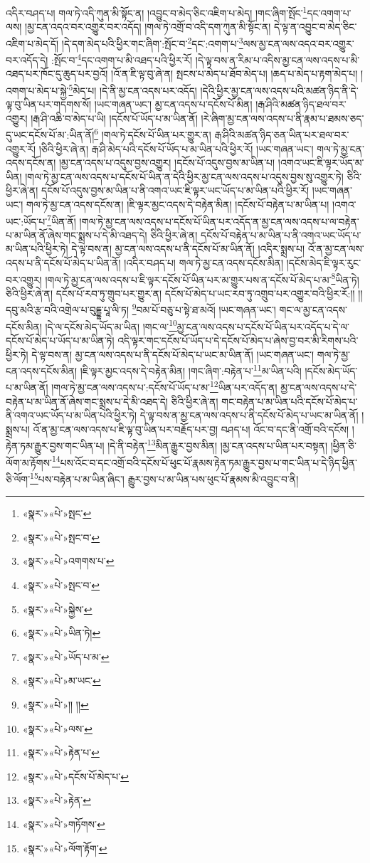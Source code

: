 འདིར་བཤད་པ། གལ་ཏེ་འདི་ཀུན་མི་སྟོང་ན། །འབྱུང་བ་མེད་ཅིང་འཇིག་པ་མེད། །གང་ཞིག་སྤོང་\footnote{«སྣར་»«པེ་»སྤང་}དང་འགག་པ་ལས། །མྱ་ངན་འདའ་བར་འགྱུར་བར་འདོད། །གལ་ཏེ་འགྲོ་བ་འདི་དག་ཀུན་མི་སྟོང་ན། དེ་ལྟ་ན་འབྱུང་བ་མེད་ཅིང་འཇིག་པ་མེད་དོ། །དེ་དག་མེད་པའི་ཕྱིར་གང་ཞིག་:སྤོང་བ་\footnote{«སྣར་»«པེ་»སྤང་བ་}དང་:འགག་པ་\footnote{«སྣར་»«པེ་»འགགས་པ་}ལས་མྱ་ངན་ལས་འདའ་བར་འགྱུར་བར་འདོད་དེ། :སྤོང་བ་\footnote{«སྣར་»«པེ་»སྤང་བ་}དང་འགག་པ་མི་འཐད་པའི་ཕྱིར་རོ། །དེ་ལྟ་བས་ན་རིམ་པ་འདིས་མྱ་ངན་ལས་འདས་པ་མི་འཐད་པར་ཁོང་དུ་ཆུད་པར་བྱའོ། །འོ་ན་ཇི་ལྟ་བུ་ཞེ་ན། སྤངས་པ་མེད་པ་ཐོབ་མེད་པ། །ཆད་པ་མེད་པ་རྟག་མེད་པ། །འགག་པ་མེད་པ་སྐྱེ་\footnote{«སྣར་»«པེ་»སྐྱེས་}མེད་པ། །དེ་ནི་མྱ་ངན་འདས་པར་འདོད། །དེའི་ཕྱིར་མྱ་ངན་ལས་འདས་པའི་མཚན་ཉིད་ནི་དེ་ལྟ་བུ་ཡིན་པར་གདགས་སོ། །ཡང་གཞན་ཡང་། མྱ་ངན་འདས་པ་དངོས་པོ་མིན། །རྒ་ཤིའི་མཚན་ཉིད་ཐལ་བར་འགྱུར། །རྒ་ཤི་འཆི་བ་མེད་པ་ཡི། །དངོས་པོ་ཡོད་པ་མ་ཡིན་ནོ། །རེ་ཞིག་མྱ་ངན་ལས་འདས་པ་ནི་རྣམ་པ་ཐམས་ཅད་དུ་ཡང་དངོས་པོ་མ་:ཡིན་ནོ།\footnote{«སྣར་»«པེ་»ཡིན་ཏེ།} །གལ་ཏེ་དངོས་པོ་ཡིན་པར་གྱུར་ན། རྒ་ཤིའི་མཚན་ཉིད་ཅན་ཡིན་པར་ཐལ་བར་འགྱུར་རོ། །ཅིའི་ཕྱིར་ཞེ་ན། རྒ་ཤི་མེད་པའི་དངོས་པོ་ཡོད་པ་མ་ཡིན་པའི་ཕྱིར་རོ། །ཡང་གཞན་ཡང་། གལ་ཏེ་མྱ་ངན་འདས་དངོས་ན། །མྱ་ངན་འདས་པ་འདུས་བྱས་འགྱུར། །དངོས་པོ་འདུས་བྱས་མ་ཡིན་པ། །འགའ་ཡང་ཇི་ལྟར་ཡོད་མ་ཡིན། །གལ་ཏེ་མྱ་ངན་ལས་འདས་པ་དངོས་པོ་ཡིན་ན་དེའི་ཕྱིར་མྱ་ངན་ལས་འདས་པ་འདུས་བྱས་སུ་འགྱུར་ཏེ། ཅིའི་ཕྱིར་ཞེ་ན། དངོས་པོ་འདུས་བྱས་མ་ཡིན་པ་ནི་འགའ་ཡང་ཇི་ལྟར་ཡང་ཡོད་པ་མ་ཡིན་པའི་ཕྱིར་རོ། །ཡང་གཞན་ཡང་། གལ་ཏེ་མྱ་ངན་འདས་དངོས་ན། །ཇི་ལྟར་མྱང་འདས་དེ་བརྟེན་མིན། །དངོས་པོ་བརྟེན་པ་མ་ཡིན་པ། །འགའ་ཡང་:ཡོད་པ་\footnote{«སྣར་»«པེ་»ཡོད་པ་མ་}ཡིན་ནོ། །གལ་ཏེ་མྱ་ངན་ལས་འདས་པ་དངོས་པོ་ཡིན་པར་འདོད་ན་མྱ་ངན་ལས་འདས་པ་ལ་བརྟེན་པ་མ་ཡིན་ནོ་ཞེས་གང་སྨྲས་པ་དེ་མི་འཐད་དེ། ཅིའི་ཕྱིར་ཞེ་ན། དངོས་པོ་བརྟེན་པ་མ་ཡིན་པ་ནི་འགའ་ཡང་ཡོད་པ་མ་ཡིན་པའི་ཕྱིར་ཏེ། དེ་ལྟ་བས་ན། མྱ་ངན་ལས་འདས་པ་ནི་དངོས་པོ་མ་ཡིན་ནོ། །འདིར་སྨྲས་པ། འོ་ན་མྱ་ངན་ལས་འདས་པ་ནི་དངོས་པོ་མེད་པ་ཡིན་ནོ། །འདིར་བཤད་པ། གལ་ཏེ་མྱ་ངན་འདས་དངོས་མིན། །དངོས་མེད་ཇི་ལྟར་རུང་བར་འགྱུར། །གལ་ཏེ་མྱ་ངན་ལས་འདས་པ་ཇི་ལྟར་དངོས་པོ་ཡིན་པར་མ་གྱུར་པས་ན་དངོས་པོ་མེད་པ་མ་\footnote{«སྣར་»«པེ་»མ་ཡང་}ཡིན་ཏེ། ཅིའི་ཕྱིར་ཞེ་ན། དངོས་པོ་རབ་ཏུ་གྲུབ་པར་གྱུར་ན། དངོས་པོ་མེད་པ་ཡང་རབ་ཏུ་འགྲུབ་པར་འགྱུར་བའི་ཕྱིར་རོ:།། །།དབུ་མའི་རྩ་བའི་འགྲེལ་པ་བུདྡྷ་པཱ་ལི་ཏ། \footnote{«སྣར་»«པེ་»།། །། }བམ་པོ་བཅུ་པ་སྟེ་ཐ་མའོ། །ཡང་གཞན་ཡང་། གང་ལ་མྱ་ངན་འདས་དངོས་མིན། །དེ་ལ་དངོས་མེད་ཡོད་མ་ཡིན། །གང་ལ་\footnote{«སྣར་»«པེ་»ལས་}མྱ་ངན་ལས་འདས་པ་དངོས་པོ་ཡིན་པར་འདོད་པ་དེ་ལ་དངོས་པོ་མེད་པ་ཡོད་པ་མ་ཡིན་ཏེ། འདི་ལྟར་གང་དངོས་པོ་ཡོད་པ་དེ་དངོས་པོ་མེད་པ་ཞེས་བྱ་བར་མི་རིགས་པའི་ཕྱིར་ཏེ། དེ་ལྟ་བས་ན། མྱ་ངན་ལས་འདས་པ་ནི་དངོས་པོ་མེད་པ་ཡང་མ་ཡིན་ནོ། །ཡང་གཞན་ཡང་། གལ་ཏེ་མྱ་ངན་འདས་དངོས་མིན། །ཇི་ལྟར་མྱང་འདས་དེ་བརྟེན་མིན། །གང་ཞིག་:བརྟེན་པ་\footnote{«སྣར་»«པེ་»རྟེན་པ་}མ་ཡིན་པའི། །དངོས་མེད་ཡོད་པ་མ་ཡིན་ནོ། །གལ་ཏེ་མྱ་ངན་ལས་འདས་པ་:དངོས་པོ་ཡོད་པ་མ་\footnote{«སྣར་»«པེ་»དངོས་པོ་མེད་པ་}ཡིན་པར་འདོད་ན། མྱ་ངན་ལས་འདས་པ་དེ་བརྟེན་པ་མ་ཡིན་ནོ་ཞེས་གང་སྨྲས་པ་དེ་མི་འཐད་དེ། ཅིའི་ཕྱིར་ཞེ་ན། གང་བརྟེན་པ་མ་ཡིན་པའི་དངོས་པོ་མེད་པ་ནི་འགའ་ཡང་ཡོད་པ་མ་ཡིན་པའི་ཕྱིར་ཏེ། དེ་ལྟ་བས་ན་མྱ་ངན་ལས་འདས་པ་ནི་དངོས་པོ་མེད་པ་ཡང་མ་ཡིན་ནོ། །སྨྲས་པ། འོ་ན་མྱ་ངན་ལས་འདས་པ་ཇི་ལྟ་བུ་ཡིན་པར་བརྗོད་པར་བྱ། བཤད་པ། འོང་བ་དང་ནི་འགྲོ་བའི་དངོས། །རྟེན་ཏམ་རྒྱུར་བྱས་གང་ཡིན་པ། །དེ་ནི་བརྟེན་\footnote{«སྣར་»«པེ་»རྟེན་}མིན་རྒྱུར་བྱས་མིན། །མྱ་ངན་འདས་པ་ཡིན་པར་བསྟན། །ཕྱིན་ཅི་ལོག་མ་རྟོགས་\footnote{«སྣར་»«པེ་»གཏོགས་}པས་འོང་བ་དང་འགྲོ་བའི་དངོས་པོ་ཕུང་པོ་རྣམས་རྟེན་ཏམ་རྒྱུར་བྱས་པ་གང་ཡིན་པ་དེ་ཉིད་ཕྱིན་ཅི་ལོག་\footnote{«སྣར་»«པེ་»ལོག་རྟོག་}པས་བརྟེན་པ་མ་ཡིན་ཞིང་། རྒྱུར་བྱས་པ་མ་ཡིན་པས་ཕུང་པོ་རྣམས་མི་འབྱུང་བ་ནི། 